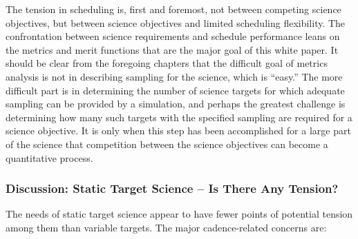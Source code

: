 The tension in scheduling is, first and foremost, not between competing
science objectives, but between science objectives and limited
scheduling flexibility. The confrontation between science requirements
and schedule performance leans on the metrics and merit functions that
are the major goal of this white paper.  It should be clear from the
foregoing chapters that the difficult goal of metrics analysis is not in
describing sampling for the science, which is ``easy.''  The more
difficult part is in determining the number of science targets for which
adequate sampling can be provided by a simulation, and perhaps the
greatest challenge is determining how many such targets with the
specified sampling are required for a science objective.  It is only
when this step has been accomplished for a large part of the science
that competition between the science objectives can become a
quantitative process.


\subsubsection{Discussion: Static Target Science -- Is There Any Tension?}

The needs of static target science appear to have fewer points of
potential tension among them than variable targets.  The major
cadence-related concerns are:

